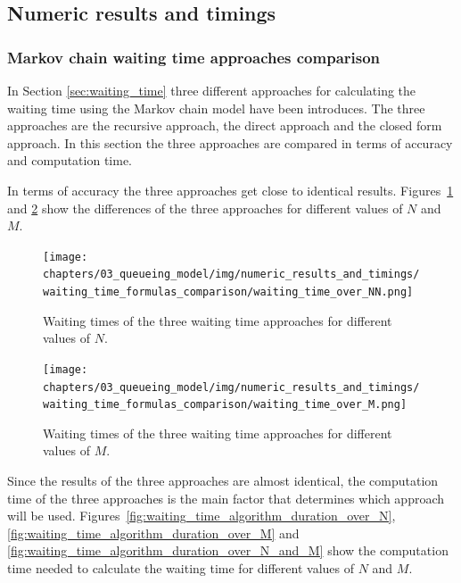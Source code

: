 \subsection{Numeric results and timings}\label{sec:truncation_effect}

\subsubsection{Markov chain waiting time approaches comparison}
\label{sec:waiting_time_approach_comparison}

In Section \ref{sec:waiting_time} three different approaches for calculating
the waiting time using the Markov chain model have been introduces.
The three approaches are the recursive approach, the direct approach and
the closed form approach.
In this section the three approaches are compared in terms of accuracy and
computation time.

In terms of accuracy the three approaches get close to identical results.
Figures~\ref{fig:waiting_time_accuracy_over_N} and
\ref{fig:waiting_time_accuracy_over_M} show the differences of the three
approaches for different values of \(N\) and \(M\).


\begin{figure}[H]
    \texttt{[image: chapters/03\_queueing\_model/img/numeric\_results\_and\_timings/waiting\_time\_formulas\_comparison/waiting\_time\_over\_NN.png]}
    \caption{Waiting times of the three waiting time approaches for different
    values of \(N\).}
    \label{fig:waiting_time_accuracy_over_N}
\end{figure}
    
\begin{figure}[H]
    \texttt{[image: chapters/03\_queueing\_model/img/numeric\_results\_and\_timings/waiting\_time\_formulas\_comparison/waiting\_time\_over\_M.png]}
    \caption{Waiting times of the three waiting time approaches for different
    values of \(M\).}
    \label{fig:waiting_time_accuracy_over_M}
\end{figure}


Since the results of the three approaches are almost identical, the computation
time of the three approaches is the main factor that determines which
approach will be used.
Figures~\ref{fig:waiting_time_algorithm_duration_over_N}, 
\ref{fig:waiting_time_algorithm_duration_over_M} and 
\ref{fig:waiting_time_algorithm_duration_over_N_and_M} show the computation
time needed to calculate the waiting time for different values of \(N\) and
\(M\).

